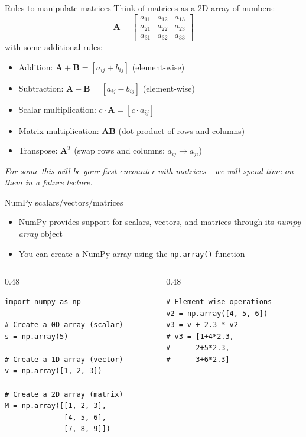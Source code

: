 \documentclass{beamer}
\begin{document}
\begin{frame}{Rules to manipulate matrices}
    Think of matrices as a 2D array of numbers:
    $$\mathbf{A} = \begin{bmatrix}
    a_{11} & a_{12} & a_{13} \\
    a_{21} & a_{22} & a_{23} \\
    a_{31} & a_{32} & a_{33}
    \end{bmatrix}$$
    with some additional rules:
    \begin{itemize}
        \item Addition: $\mathbf{A} + \mathbf{B} = [a_{ij} + b_{ij}]$ (element-wise)
        \item Subtraction: $\mathbf{A} - \mathbf{B} = [a_{ij} - b_{ij}]$ (element-wise)
        \item Scalar multiplication: $c \cdot \mathbf{A} = [c \cdot a_{ij}]$
        \item Matrix multiplication: $\mathbf{A} \mathbf{B}$ (dot product of rows and columns)
        \item Transpose: $\mathbf{A}^T$ (swap rows and columns: $a_{ij} \to a_{ji}$)
    \end{itemize}
    \textit{For some this will be your first encounter with matrices - we will spend time on them in a future lecture. }
\end{frame}


\begin{frame}[fragile]{NumPy scalars/vectors/matrices}
    \begin{itemize}
        \item NumPy provides support for scalars, vectors, and matrices through its \textit{numpy array} object
        \item You can create a NumPy array using the \texttt{np.array()} function
    \end{itemize}

    \begin{columns}[T,onlytextwidth]
      \begin{column}{0.48\textwidth}
        \begin{verbatim}
import numpy as np

# Create a 0D array (scalar)
s = np.array(5)

# Create a 1D array (vector)
v = np.array([1, 2, 3])

# Create a 2D array (matrix)
M = np.array([[1, 2, 3],
              [4, 5, 6],
              [7, 8, 9]])
        \end{verbatim}
      \end{column}
      \begin{column}{0.48\textwidth}
        \begin{verbatim}
# Element-wise operations
v2 = np.array([4, 5, 6])
v3 = v + 2.3 * v2
# v3 = [1+4*2.3, 
#      2+5*2.3, 
#      3+6*2.3]

        \end{verbatim}
      \end{column}
    \end{columns}
\end{frame}
\end{document}
